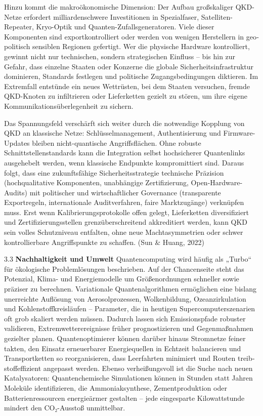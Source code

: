 Hinzu kommt die makro­ökono­mische Dimension: Der Aufbau großskaliger QKD-Netze erfordert milliardenschwere Investitionen in Spezial­faser, Satelliten-Repeater, Kryo-Optik und Quanten-Zufalls­generatoren. Viele dieser Komponenten sind exportkontrolliert oder werden von wenigen Herstellern in geo­poli­tisch sensiblen Regionen gefertigt. Wer die physische Hardware kontrolliert, gewinnt nicht nur technischen, sondern strategischen Einfluss – bis hin zur Gefahr, dass einzelne Staaten oder Konzerne die globale Sicherheits­­infra­struktur dominieren, Standards festlegen und politische Zugangs­bedingungen diktieren. Im Extremfall entstünde ein neues Wettrüsten, bei dem Staaten versuchen, fremde QKD-Knoten zu infiltrieren oder Lieferketten gezielt zu stören, um ihre eigene Kommunikations­­überlegenheit zu sichern.

Das Spannungsfeld verschärft sich weiter durch die notwendige Kopplung von QKD an klassische Netze: Schlüsselmanagement, Authentisierung und Firmware-Updates bleiben nicht-quantische Angriffsflächen. Ohne robuste Schnittstellenstandards kann die Integration selbst hochsicherer Quantenlinks ausgehebelt werden, wenn klassische Endpunkte kompromittiert sind. Daraus folgt, dass eine zukunftsfähige Sicherheits­strategie technische Präzision (hochqualitative Komponenten, unabhängige Zertifizierung, Open-Hardware-Audits) mit politischer und wirtschaftlicher Governance (transparente Exportregeln, internationale Auditverfahren, faire Marktzugänge) verknüpfen muss. Erst wenn Kalibrierungs­­protokolle offen gelegt, Lieferketten diversifiziert und Zertifizierungs­­stellen grenz­über­schreitend akkreditiert werden, kann QKD sein volles Schutzniveau entfalten, ohne neue Macht­­asymmetrien oder schwer kontrollierbare Angriffspunkte zu schaffen. (Sun & Huang, 2022)


3.3 \textbf{Nachhaltigkeit und Umwelt}
Quantencomputing wird häufig als „Turbo“ für ökologische Problemlösungen beschrieben. Auf der Chancen­­seite steht das Potenzial, Klima- und Energie­modelle um Größen­ordnungen schneller sowie präziser zu berechnen. Variationale Quanten­algorithmen ermöglichen eine bislang unerreichte Auflösung von Aerosol­prozessen, Wolken­bildung, Ozean­zirkulation und Kohlenstoff­kreisläufen – Parameter, die in heutigen Supercomputer­szenarien oft grob skaliert werden müssen. Dadurch lassen sich Emissions­pfade robuster validieren, Extrem­wetter­ereignisse früher prognostizieren und Gegen­maßnahmen gezielter planen. Quanten­optimierer können darüber hinaus Stromnetze feiner takten, den Einsatz erneuerbarer Energiequellen in Echtzeit balancieren und Transport­ketten so reorganisieren, dass Leer­fahrten minimiert und Routen treib­stoff­effizient angepasst werden. Ebenso verheißungsvoll ist die Suche nach neuen Katalysatoren: Quantenchemische Simulationen können in Stunden statt Jahren Moleküle identifizieren, die Ammoniak­synthese, Zement­produktion oder Batterienressourcen energie­ärmer gestalten – jede eingesparte Kilowattstunde mindert den CO₂-Ausstoß unmittelbar.

